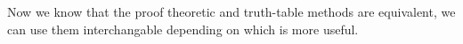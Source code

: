 Now we know that the proof theoretic and truth-table methods are equivalent, we can use them interchangable depending on which is more useful.

%
%
%
%
%

